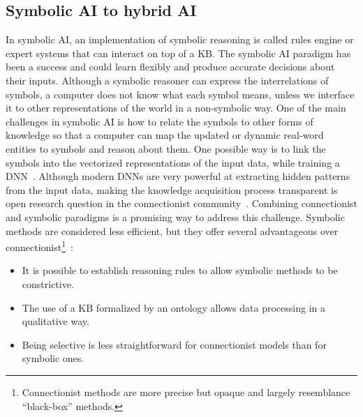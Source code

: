 \subsection{Symbolic AI to hybrid AI}
In symbolic AI, an implementation of symbolic reasoning is called rules engine or expert systems that can interact on top of a KB. The symbolic AI paradigm has been a success and could learn flexibly and produce accurate decisions about their inputs. Although a symbolic reasoner can express the interrelations of symbols, a computer does not know what each symbol means, unless we interface it to other representations of the world in a non-symbolic way. One of the main challenges in symbolic AI is how to relate the symbols to other forms of knowledge so that a computer can map the updated or dynamic real-word entities to symbols and reason about them. 
One possible way is to link the symbols into the vectorized representations of the input data, while training a DNN~\cite{SAI,sarker2017explaining}. Although modern DNNs are very powerful at extracting hidden patterns from the input data, making the knowledge acquisition process transparent is open research question in the connectionist community~\cite{futia2020integration}.  
Combining connectionist and symbolic paradigms is a promising way to address this challenge. Symbolic methods are considered less efficient, but they offer several advantageous over connectionist\footnote{Connectionist methods are more precise but opaque and largely resemblance ``black-box'' methods.}~\cite{futia2020integration}:

\begin{itemize}[noitemsep]
    \item It is possible to establish reasoning rules to allow symbolic methods to be constrictive.
    \item The use of a $\mathrm{KB}$ formalized by an ontology allows data processing in a qualitative way.
    \item Being selective is less straightforward for connectionist models than for symbolic ones.
\end{itemize}

